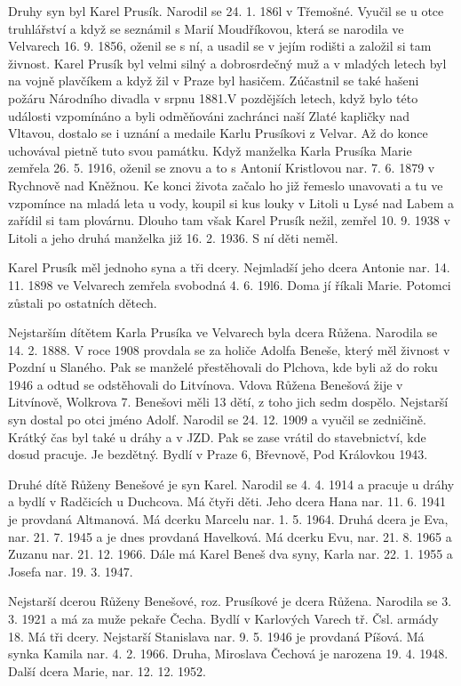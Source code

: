 \documentclass[../dejiny-rodu-prusiku.tex]{subfiles}
\begin{document}
Druhy syn byl Karel Prusík. Narodil se 24. 1. 186l v Tře­mošné. Vyučil se u otce truhlářství a když se seznámil s Marií Moudříkovou, která se narodila ve Velvarech 16. 9. 1856, oženil se s ní, a usadil se v jejím rodišti
a založil si tam živnost. Karel Prusík byl velmi silný a dobrosrdečný muž a v mladých letech byl na vojně plavčíkem a když žil v Praze byl hasičem. Zúčastnil se také hašeni požáru Národního divadla v srpnu 1881.V pozdějších letech, když bylo této události vzpomíná­no a byli odměňováni zachránci naší Zlaté kapličky nad Vltavou, dostalo se i uznání a medaile Karlu Prusíkovi z Velvar. Až do konce uchovával pietně tuto svou památku. Když manželka Karla Prusíka Marie zemřela 26. 5. 1916, oženil se znovu a to s Antonií Kristlovou nar. 7. 6. 1879 v Rychnově nad Kněžnou. Ke konci života zača­lo ho již řemeslo unavovati a tu ve vzpomínce na mla­dá leta u vody, koupil si kus louky v Litoli u Lysé nad Labem a zařídil si tam plovárnu. Dlouho tam však Karel Prusík nežil, zemřel 10. 9. 1938 v Litoli a jeho druhá manželka již 16. 2. 1936. S ní děti neměl.

Karel Prusík měl jednoho syna a tři dcery. Nejmladší jeho dcera Antonie nar. 14. 11. 1898 ve Velvarech zemřela svobodná 4. 6. 19l6. Doma jí říkali Marie. Potomci zů­stali po ostatních dětech.

Nejstarším dítětem Karla Prusíka ve Velvarech byla dcera Růžena. Narodila se 14. 2. 1888. V roce 1908 provda­la se za holiče Adolfa Beneše, který měl živnost v Pozdní u Slaného. Pak se manželé přestěhovali do Plchova, kde byli až do roku 1946 a odtud se odstěhovali do Litvínova. Vdova Růžena Benešová žije v Litvínově, Wolkrova 7. Benešovi měli 13 dětí, z toho jich sedm dospělo. Nejstarší syn dostal po otci jméno Adolf. Naro­dil se 24. 12. 1909 a vyučil se zedničině. Krátký čas byl také u dráhy a v JZD. Pak se zase vrátil do stavebnictví, kde dosud pracuje. Je bezdětný. Bydlí v Praze 6, Břevnově, Pod Královkou 1943.

Druhé dítě Růženy Benešové je syn Karel. Narodil se 4. 4. 1914 a pracuje u dráhy a bydlí v Radčicích u Duchcova. Má čtyři děti. Jeho dcera Hana nar. 11. 6. 1941 je provdaná Altmanová. Má dcerku Marcelu nar. 1. 5. 1964. Druhá dcera je Eva, nar. 21. 7. 1945 a je dnes provdaná Havelková. Má dcerku Evu, nar. 21. 8. 1965 a Zuzanu nar. 21. 12. 1966. Dále má Karel Beneš dva syny, Karla nar. 22. 1. 1955 a Josefa nar. 19. 3. 1947.

Nejstarší dcerou Růženy Benešové, roz. Prusíkové je dcera Růžena. Narodila se 3. 3. 1921 a má za muže pekaře Čecha. Bydlí v Karlových Varech tř. Čsl. armády 18. Má tři dcery. Nejstarší Stanislava nar. 9. 5. 1946 je provdaná Píšová. Má synka Kamila nar. 4. 2. 1966. Druha, Miroslava Čechová je narozena 19. 4. 1948. Další dcera Marie, nar. 12. 12. 1952.
\end{document}
